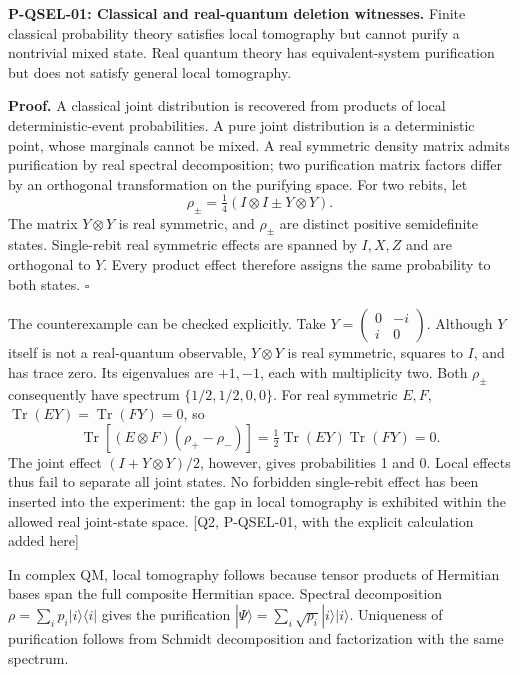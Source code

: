 \documentclass[
  11pt,
  oneside]{book}
\begin{document}
\label{p-qsel-01}{}

\textbf{P-QSEL-01: Classical and real-quantum deletion witnesses.}
Finite classical probability theory satisfies local tomography but
cannot purify a nontrivial mixed state. Real quantum theory has
equivalent-system purification but does not satisfy general local
tomography.

\textbf{Proof.} A classical joint distribution is recovered from
products of local deterministic-event probabilities. A pure joint
distribution is a deterministic point, whose marginals cannot be mixed.
A real symmetric density matrix admits purification by real spectral
decomposition; two purification matrix factors differ by an orthogonal
transformation on the purifying space. For two rebits, let \[
\rho_\pm=\tfrac14(I\otimes I\pm Y\otimes Y).
\] The matrix \(Y\otimes Y\) is real symmetric, and \(\rho_\pm\) are
distinct positive semidefinite states. Single-rebit real symmetric
effects are spanned by \(I,X,Z\) and are orthogonal to \(Y\). Every
product effect therefore assigns the same probability to both states.
\(\square\)

The counterexample can be checked explicitly. Take
\(Y=\left(\begin{smallmatrix}0&-i\\i&0\end{smallmatrix}\right)\).
Although \(Y\) itself is not a real-quantum observable, \(Y\otimes Y\)
is real symmetric, squares to \(I\), and has trace zero. Its eigenvalues
are \(+1,-1\), each with multiplicity two. Both \(\rho_\pm\)
consequently have spectrum \(\{1/2,1/2,0,0\}\). For real symmetric
\(E,F\), \(\operatorname{Tr}(EY)=\operatorname{Tr}(FY)=0\), so \[
\operatorname{Tr}[(E\otimes F)(\rho_+-\rho_-)]=
\tfrac12\operatorname{Tr}(EY)\operatorname{Tr}(FY)=0.
\] The joint effect \((I+Y\otimes Y)/2\), however, gives probabilities 1
and 0. Local effects thus fail to separate all joint states. No
forbidden single-rebit effect has been inserted into the experiment: the
gap in local tomography is exhibited within the allowed real joint-state
space. {[}Q2, P-QSEL-01, with the explicit calculation added here{]}

In complex QM, local tomography follows because tensor products of
Hermitian bases span the full composite Hermitian space. Spectral
decomposition \(\rho=\sum_i p_i|i\rangle\langle i|\) gives the
purification \(|\Psi\rangle=\sum_i\sqrt{p_i}|i\rangle|i\rangle\).
Uniqueness of purification follows from Schmidt decomposition and
factorization with the same spectrum.
\end{document}
